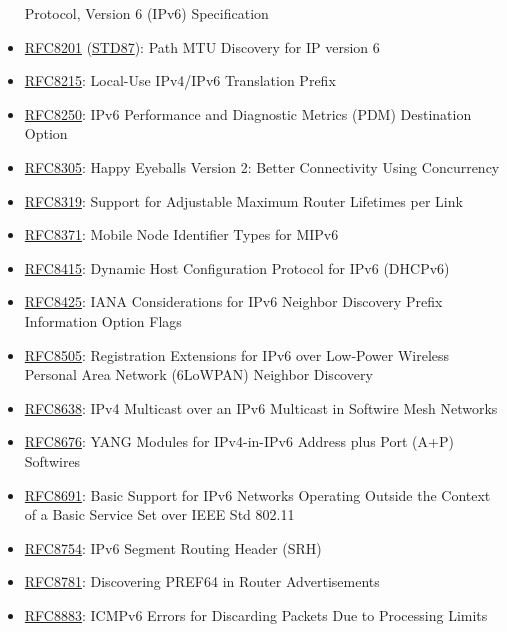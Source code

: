\documentclass[
]{article}
\begin{document}
\begin{itemize}
  Protocol, Version 6 (IPv6) Specification
\item
  \href{https://www.rfc-editor.org/info/rfc8201}{RFC8201}
  (\href{https://www.rfc-editor.org/info/std87}{STD87}): Path MTU
  Discovery for IP version 6
\item
  \href{https://www.rfc-editor.org/info/rfc8215}{RFC8215}: Local-Use
  IPv4/IPv6 Translation Prefix
\item
  \href{https://www.rfc-editor.org/info/rfc8250}{RFC8250}: IPv6
  Performance and Diagnostic Metrics (PDM) Destination Option
\item
  \href{https://www.rfc-editor.org/info/rfc8305}{RFC8305}: Happy
  Eyeballs Version 2: Better Connectivity Using Concurrency
\item
  \href{https://www.rfc-editor.org/info/rfc8319}{RFC8319}: Support for
  Adjustable Maximum Router Lifetimes per Link
\item
  \href{https://www.rfc-editor.org/info/rfc8371}{RFC8371}: Mobile Node
  Identifier Types for MIPv6
\item
  \href{https://www.rfc-editor.org/info/rfc8415}{RFC8415}: Dynamic Host
  Configuration Protocol for IPv6 (DHCPv6)
\item
  \href{https://www.rfc-editor.org/info/rfc8425}{RFC8425}: IANA
  Considerations for IPv6 Neighbor Discovery Prefix Information Option
  Flags
\item
  \href{https://www.rfc-editor.org/info/rfc8505}{RFC8505}: Registration
  Extensions for IPv6 over Low-Power Wireless Personal Area Network
  (6LoWPAN) Neighbor Discovery
\item
  \href{https://www.rfc-editor.org/info/rfc8638}{RFC8638}: IPv4
  Multicast over an IPv6 Multicast in Softwire Mesh Networks
\item
  \href{https://www.rfc-editor.org/info/rfc8676}{RFC8676}: YANG Modules
  for IPv4-in-IPv6 Address plus Port (A+P) Softwires
\item
  \href{https://www.rfc-editor.org/info/rfc8691}{RFC8691}: Basic Support
  for IPv6 Networks Operating Outside the Context of a Basic Service Set
  over IEEE Std 802.11
\item
  \href{https://www.rfc-editor.org/info/rfc8754}{RFC8754}: IPv6 Segment
  Routing Header (SRH)
\item
  \href{https://www.rfc-editor.org/info/rfc8781}{RFC8781}: Discovering
  PREF64 in Router Advertisements
\item
  \href{https://www.rfc-editor.org/info/rfc8883}{RFC8883}: ICMPv6 Errors
  for Discarding Packets Due to Processing Limits

\end{itemize}
\end{document}

